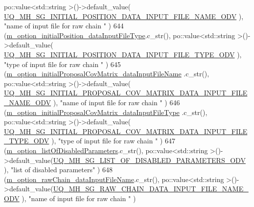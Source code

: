 \begin{DoxyCode}
       po::value<std::string >()->default\_value(
      \hyperlink{_metropolis_hastings_s_g_options_8h_a33cdb8e98a96faf5965251da49ea1738}{UQ\_MH\_SG\_INITIAL\_POSITION\_DATA\_INPUT\_FILE\_NAME\_ODV}       
          ), \textcolor{stringliteral}{"name of input file for raw chain "}                          )
644     (\hyperlink{class_q_u_e_s_o_1_1_metropolis_hastings_s_g_options_ad997674bedeb76faf75773dc8c3dfd17}{m\_option\_initialPosition\_dataInputFileType}.c\_str(),         
       po::value<std::string >()->default\_value(
      \hyperlink{_metropolis_hastings_s_g_options_8h_a27ebaa9c84f210aba1c4c3e5efd88cb4}{UQ\_MH\_SG\_INITIAL\_POSITION\_DATA\_INPUT\_FILE\_TYPE\_ODV}       
          ), \textcolor{stringliteral}{"type of input file for raw chain "}                          )
645     (\hyperlink{class_q_u_e_s_o_1_1_metropolis_hastings_s_g_options_a9d80faf22cf4d5614819ae5259463e89}{m\_option\_initialProposalCovMatrix\_dataInputFileName}
      .c\_str(), po::value<std::string >()->default\_value(
      \hyperlink{_metropolis_hastings_s_g_options_8h_ae1bcc09f86196a9dd9ff246c4f045ccc}{UQ\_MH\_SG\_INITIAL\_PROPOSAL\_COV\_MATRIX\_DATA\_INPUT\_FILE\_NAME\_ODV}
      ), \textcolor{stringliteral}{"name of input file for raw chain "}                          )
646     (\hyperlink{class_q_u_e_s_o_1_1_metropolis_hastings_s_g_options_a00116cfe535c1bea24a321f76c8c501a}{m\_option\_initialProposalCovMatrix\_dataInputFileType}
      .c\_str(), po::value<std::string >()->default\_value(
      \hyperlink{_metropolis_hastings_s_g_options_8h_a7b132e374b4dc6168db874b08f6268be}{UQ\_MH\_SG\_INITIAL\_PROPOSAL\_COV\_MATRIX\_DATA\_INPUT\_FILE\_TYPE\_ODV}
      ), \textcolor{stringliteral}{"type of input file for raw chain "}                          )
647     (\hyperlink{class_q_u_e_s_o_1_1_metropolis_hastings_s_g_options_ae3b9e124f89c653b2b2b09d97baa87ba}{m\_option\_listOfDisabledParameters}.c\_str(),                   
      po::value<std::string >()->default\_value(\hyperlink{_metropolis_hastings_s_g_options_8h_a77e000e95022a4d610836d7bc4972a48}{UQ\_MH\_SG\_LIST\_OF\_DISABLED\_PARAMETERS\_ODV}
                           ), \textcolor{stringliteral}{"list of disabled parameters"}                                )
648     (\hyperlink{class_q_u_e_s_o_1_1_metropolis_hastings_s_g_options_a5527cd4da92ce0da6488df811ae5a0b0}{m\_option\_rawChain\_dataInputFileName}.c\_str(),                 
      po::value<std::string >()->default\_value(\hyperlink{_metropolis_hastings_s_g_options_8h_a142f5c2c1733ac8304c69ee04ae6566d}{UQ\_MH\_SG\_RAW\_CHAIN\_DATA\_INPUT\_FILE\_NAME\_ODV}
                        ), \textcolor{stringliteral}{"name of input file for raw chain "}                          )

\end{DoxyCode}
